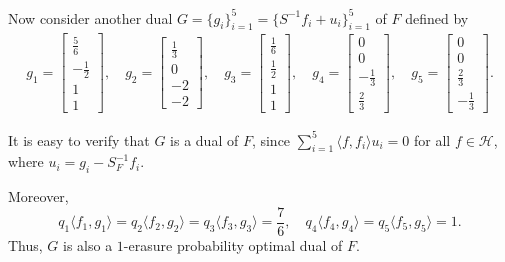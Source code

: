 \documentclass[final,1p,times]{elsarticle}
\begin{document}
Now consider another dual $G = \{g_i\}_{i=1}^5 = \{S^{-1}f_i +u_i\}_{i=1}^5$ of $F$ defined by
\[
\begin{aligned}
g_1 = \begin{bmatrix} \frac{5}{6} \\ -\frac{1}{2} \\ 1 \\ 1 \end{bmatrix} , \quad
g_2 = \begin{bmatrix} \frac{1}{3} \\ 0 \\ -2 \\ -2 \end{bmatrix}, \quad
g_3 = \begin{bmatrix} \frac{1}{6} \\ \frac{1}{2} \\ 1 \\ 1 \end{bmatrix}, \quad
g_4 = \begin{bmatrix} 0 \\ 0 \\ -\frac{1}{3} \\ \frac{2}{3} \end{bmatrix} , \quad
g_5 = \begin{bmatrix} 0 \\ 0 \\ \frac{2}{3} \\ -\frac{1}{3} \end{bmatrix} .
\end{aligned}
\]

It is easy to verify that $G$ is a dual of $F$, since $\sum_{i=1}^5 \langle f, f_i \rangle u_i = 0$ for all $f \in \mathcal{H}$, where $u_i = g_i - S_F^{-1} f_i$.

Moreover,
\[
q_1\langle f_1, g_1 \rangle = q_2\langle f_2, g_2 \rangle = q_3\langle f_3, g_3 \rangle = \frac{7}{6}, \quad
q_4\langle f_4, g_4 \rangle = q_5\langle f_5, g_5 \rangle = 1.
\]
Thus, $G$ is also a $1$-erasure probability optimal dual of $F$.
\end{document}
